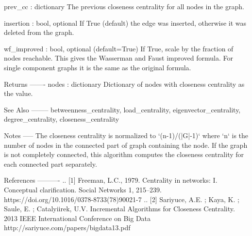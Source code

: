 \begin{DoxyVerb}
prev_cc : dictionary
  The previous closeness centrality for all nodes in the graph.

insertion : bool, optional
  If True (default) the edge was inserted, otherwise it was deleted from the graph.

wf_improved : bool, optional (default=True)
  If True, scale by the fraction of nodes reachable. This gives the
  Wasserman and Faust improved formula. For single component graphs
  it is the same as the original formula.

Returns
-------
nodes : dictionary
  Dictionary of nodes with closeness centrality as the value.

See Also
--------
betweenness_centrality, load_centrality, eigenvector_centrality,
degree_centrality, closeness_centrality

Notes
-----
The closeness centrality is normalized to `(n-1)/(|G|-1)` where
`n` is the number of nodes in the connected part of graph
containing the node.  If the graph is not completely connected,
this algorithm computes the closeness centrality for each
connected part separately.

References
----------
.. [1] Freeman, L.C., 1979. Centrality in networks: I.
   Conceptual clarification.  Social Networks 1, 215--239.
   https://doi.org/10.1016/0378-8733(78)90021-7
.. [2] Sariyuce, A.E. ; Kaya, K. ; Saule, E. ; Catalyiirek, U.V. Incremental
   Algorithms for Closeness Centrality. 2013 IEEE International Conference on Big Data
   http://sariyuce.com/papers/bigdata13.pdf
\end{DoxyVerb}
 
